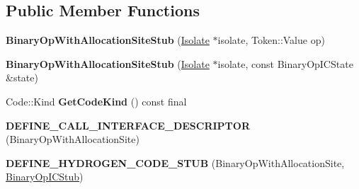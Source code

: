 \subsection*{Public Member Functions}
\begin{DoxyCompactItemize}
\item 
{\bfseries Binary\+Op\+With\+Allocation\+Site\+Stub} (\hyperlink{classv8_1_1internal_1_1_isolate}{Isolate} $\ast$isolate, Token\+::\+Value op)\hypertarget{classv8_1_1internal_1_1_binary_op_with_allocation_site_stub_aba7f76e658dbd83147bc292dd3d5f9ac}{}\label{classv8_1_1internal_1_1_binary_op_with_allocation_site_stub_aba7f76e658dbd83147bc292dd3d5f9ac}

\item 
{\bfseries Binary\+Op\+With\+Allocation\+Site\+Stub} (\hyperlink{classv8_1_1internal_1_1_isolate}{Isolate} $\ast$isolate, const Binary\+Op\+I\+C\+State \&state)\hypertarget{classv8_1_1internal_1_1_binary_op_with_allocation_site_stub_a9c2d446fb0e6e0676e704ba542eb3eb8}{}\label{classv8_1_1internal_1_1_binary_op_with_allocation_site_stub_a9c2d446fb0e6e0676e704ba542eb3eb8}

\item 
Code\+::\+Kind {\bfseries Get\+Code\+Kind} () const  final\hypertarget{classv8_1_1internal_1_1_binary_op_with_allocation_site_stub_a17a08944939b195e5c0f119a3d81a06f}{}\label{classv8_1_1internal_1_1_binary_op_with_allocation_site_stub_a17a08944939b195e5c0f119a3d81a06f}

\item 
{\bfseries D\+E\+F\+I\+N\+E\+\_\+\+C\+A\+L\+L\+\_\+\+I\+N\+T\+E\+R\+F\+A\+C\+E\+\_\+\+D\+E\+S\+C\+R\+I\+P\+T\+OR} (Binary\+Op\+With\+Allocation\+Site)\hypertarget{classv8_1_1internal_1_1_binary_op_with_allocation_site_stub_af63d7c28cf96763aaafbfe3d02b15177}{}\label{classv8_1_1internal_1_1_binary_op_with_allocation_site_stub_af63d7c28cf96763aaafbfe3d02b15177}

\item 
{\bfseries D\+E\+F\+I\+N\+E\+\_\+\+H\+Y\+D\+R\+O\+G\+E\+N\+\_\+\+C\+O\+D\+E\+\_\+\+S\+T\+UB} (Binary\+Op\+With\+Allocation\+Site, \hyperlink{classv8_1_1internal_1_1_binary_op_i_c_stub}{Binary\+Op\+I\+C\+Stub})\hypertarget{classv8_1_1internal_1_1_binary_op_with_allocation_site_stub_a383b576c2ef9ac3c88807501fdf41de1}{}\label{classv8_1_1internal_1_1_binary_op_with_allocation_site_stub_a383b576c2ef9ac3c88807501fdf41de1}

\end{DoxyCompactItemize}
